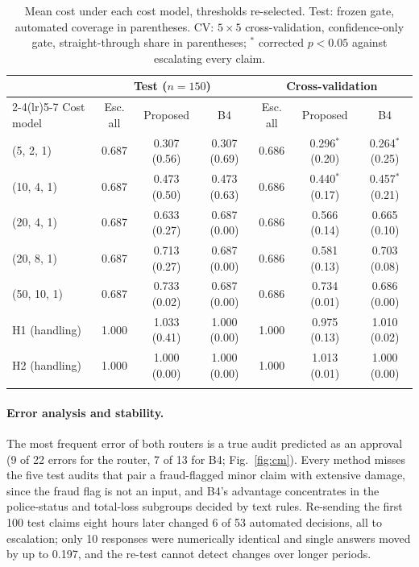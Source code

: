 \begin{table}[!htb]
\caption{Mean cost under each cost model, thresholds re-selected. Test: frozen gate, automated coverage in parentheses. CV: $5\times5$ cross-validation, confidence-only gate, straight-through share in parentheses; $^{*}$ corrected $p<0.05$ against escalating every claim.}\label{tab:cost}
\footnotesize
\begin{tabular*}{\textwidth}{@{\extracolsep{\fill}}lcccccc@{}}
\toprule
 & \multicolumn{3}{c}{Test ($n=150$)} & \multicolumn{3}{c}{Cross-validation} \\
\cmidrule(lr){2-4}\cmidrule(lr){5-7}
Cost model & Esc. all & Proposed & B4 & Esc. all & Proposed & B4 \\
\midrule
(5, 2, 1) & 0.687 & 0.307 (0.56) & 0.307 (0.69) & 0.686 & 0.296$^{*}$ (0.20) & 0.264$^{*}$ (0.25) \\
(10, 4, 1) & 0.687 & 0.473 (0.50) & 0.473 (0.63) & 0.686 & 0.440$^{*}$ (0.17) & 0.457$^{*}$ (0.21) \\
(20, 4, 1) & 0.687 & 0.633 (0.27) & 0.687 (0.00) & 0.686 & 0.566 (0.14) & 0.665 (0.10) \\
(20, 8, 1) & 0.687 & 0.713 (0.27) & 0.687 (0.00) & 0.686 & 0.581 (0.13) & 0.703 (0.08) \\
(50, 10, 1) & 0.687 & 0.733 (0.02) & 0.687 (0.00) & 0.686 & 0.734 (0.01) & 0.686 (0.00) \\
H1 (handling) & 1.000 & 1.033 (0.41) & 1.000 (0.00) & 1.000 & 0.975 (0.13) & 1.010 (0.02) \\
H2 (handling) & 1.000 & 1.000 (0.00) & 1.000 (0.00) & 1.000 & 1.013 (0.01) & 1.000 (0.00) \\
\botrule
\end{tabular*}
\end{table}

\paragraph{Error analysis and stability.}\label{sec:errors}
The most frequent error of both routers is a true audit predicted as an approval (9 of 22 errors for the router, 7 of 13 for B4; Fig.~\ref{fig:cm}). Every method misses the five test audits that pair a fraud-flagged minor claim with extensive damage, since the fraud flag is not an input, and B4's advantage concentrates in the police-status and total-loss subgroups decided by text rules. Re-sending the first 100 test claims eight hours later changed 6 of 53 automated decisions, all to escalation; only 10 responses were numerically identical and single answers moved by up to 0.197, and the re-test cannot detect changes over longer periods.

